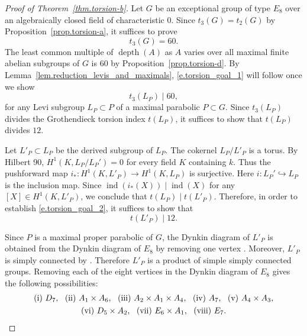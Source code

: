 \documentclass[12pt]{amsart}
\numberwithin{equation}{section}
\theoremstyle{remark}
\newcommand{\ind}{\operatorname{ind}}
\newcommand{\depth}{\operatorname{depth}}
\begin{document}
\begin{proof}[Proof of Theorem~\ref{thm.torsion-b}]
Let $G$ be an exceptional group of type $E_8$ over an algebraically closed field of characteristic $0$. Since $t_3(G) = t_2(G)$ by Proposition~\ref{prop.torsion-a}, it suffices to prove
\begin{equation}\label{e.torsion_goal_1}
    t_3(G) = 60.
\end{equation}
The least common multiple of $\depth(A)$ as $A$ varies over all maximal finite abelian subgroups of $G$ is $60$ by Proposition~\ref{prop.torsion-d}. By Lemma~\ref{lem.reduction_levis_and_maximals}, \eqref{e.torsion_goal_1} will follow once we show
\begin{equation}\label{e.torsion_goal_2}
    t_3(L_P) \mid 60,
\end{equation}
for any Levi subgroup $L_P \subset P$ of a maximal parabolic $P\subset G$. 
Since $t_3(L_P)$ divides the Grothendieck torsion index $t(L_P)$, it suffices to show that $t(L_P)$ divides $12$.

Let $L'_P \subset L_P$ be the derived subgroup of $L_P$. The cokernel $L_P/L'_P$ is a torus. By Hilbert 90, $H^1(K,L_P/L_P')=0$ for every field $K$ containing $k$. Thus the pushforward map $i_*\colon H^1(K,L'_P)\to H^1(K,L_P)$ is surjective. Here $i \colon L_P' \hookrightarrow L_P$ is the inclusion map. Since $\ind(i_*(X)) \mid \ind(X)$ for any $[X]\in H^1(K,L'_P)$, we conclude that
$t(L_P)\mid t(L'_P)$. Therefore, in order to establish
\eqref{e.torsion_goal_2}, it suffices to show that
\begin{equation}\label{e.E8_tor_2^5_not_divide_L'_P}
    t(L'_P)\mid 12.
\end{equation}

 Since $P$ is a maximal proper parabolic of $G$, the Dynkin diagram of $L'_P$ is obtained from the Dynkin diagram of $E_8$ by removing one vertex \cite{tits1965classification}. Moreover, $L'_P$ is simply connected by \cite[Corollary 5.4(b)]{springer-steinberg}. Therefore $L'_P$ is a product of simple simply connected groups.
    Removing each of the eight vertices in the Dynkin diagram of $E_8$ gives the following possibilities: 
 \begin{gather*} \text{(i) $D_7$, \, (ii) $A_1\times A_6$, \, (iii) $A_2\times A_1\times A_4$, \, (iv) $A_7$, \, (v) $A_4\times A_3$,} \\
  \text{(vi) $D_5\times A_2$, \,
   (vii) $E_6\times A_1$, \, (viii) $E_7$.}
   \end{gather*}
   

\end{proof}
\end{document}
